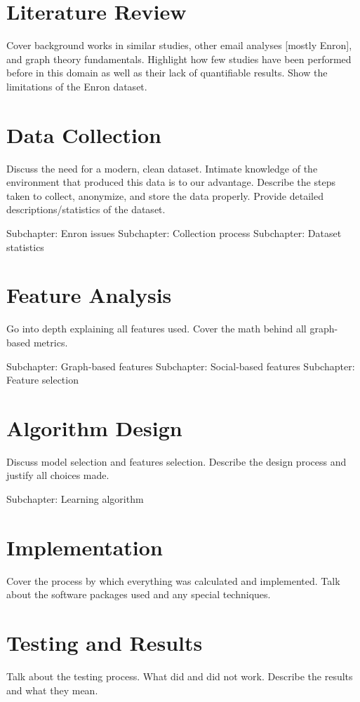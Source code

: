 \documentclass[12pt,dvips]{report}
\begin{document}
\chapter{Literature Review}
Cover background works in similar studies, other email analyses [mostly Enron], and graph theory fundamentals.  Highlight how few studies have been performed before in this domain as well as their lack of quantifiable results.  Show the limitations of the Enron dataset.


\chapter{Data Collection}
Discuss the need for a modern, clean dataset.  Intimate knowledge of the environment that produced this data is to our advantage.  Describe the steps taken to collect, anonymize, and store the data properly.  Provide detailed descriptions/statistics of the dataset.

Subchapter: Enron issues
Subchapter: Collection process
Subchapter: Dataset statistics

\chapter{Feature Analysis}
Go into depth explaining all features used.  Cover the math behind all graph-based metrics.

Subchapter: Graph-based features
Subchapter: Social-based features
Subchapter: Feature selection

\chapter{Algorithm Design}
Discuss model selection and features selection.  Describe the design process and justify all choices made.

Subchapter: Learning algorithm

\chapter{Implementation}
Cover the process by which everything was calculated and implemented.  Talk about the software packages used and any special techniques.

\chapter{Testing and Results}
Talk about the testing process.  What did and did not work.  Describe the results and what they mean.
\end{document}

